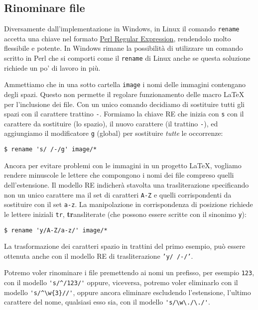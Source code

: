 \subsection{Rinominare file}

Diversamente dall'implementazione in Windows, in Linux il comando \texttt{rename} accetta una chiave nel formato \href{http://perldoc.perl.org/perlrequick.html}{Perl Regular Expression}, rendendolo molto flessibile e potente. In Windows rimane la possibilità di utilizzare un comando scritto in Perl che si comporti come il \texttt{rename} di Linux anche se questa soluzione richiede un po' di lavoro in più.

Ammettiamo che in una sotto cartella \texttt{image} i nomi delle immagini contengano degli spazi. Questo non permette il regolare funzionamento delle macro \LaTeX{} per l'inclusione dei file. Con un unico comando decidiamo di sostituire tutti gli spazi con il carattere trattino \texttt{-}. Formiamo la chiave RE che inizia con \texttt{s} con il carattere da sostituire (lo spazio), il nuovo carattere (il trattino \texttt{-}), ed aggiungiamo il modificatore \texttt{g} (global) per sostituire \emph{tutte} le occorrenze:
\begin{verbatim}
$ rename 's/ /-/g' image/*
\end{verbatim}

Ancora per evitare problemi con le immagini in un progetto \LaTeX, vogliamo rendere minuscole le lettere che compongono i nomi dei file compreso quelli dell'estensione. Il modello RE indicherà stavolta una trasliterazione specificando non un unico carattere ma il set di caratteri \texttt{A-Z} e quelli corrispondenti da sostituire con il set \texttt{a-z}. La manipolazione in corrispondenza di posizione richiede le lettere iniziali \texttt{tr}, \textbf{tr}ansliterate (che possono essere scritte con il sinonimo \texttt{y}):
\begin{verbatim}
$ rename 'y/A-Z/a-z/' image/*
\end{verbatim}

La trasformazione dei caratteri spazio in trattini del primo esempio, può essere ottenuta anche con il modello RE di trasliterazione \texttt{'y/ /-/'}.

Potremo voler rinominare i file premettendo ai nomi un prefisso, per esempio \texttt{123}, con il modello \verb='s/^/123/'= oppure, viceversa, potremo voler eliminarlo con il modello \verb='s/^\w{3}//'=, oppure ancora eliminare escludendo l'estensione, l'ultimo carattere del nome, qualsiasi esso sia, con il modello \verb='s/\w\./\./'=.


